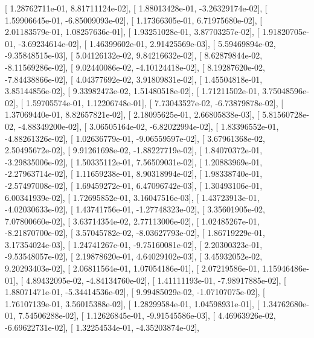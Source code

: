 \documentclass{article}
\begin{document}
       [  1.28762711e-01,   8.81711124e-02],
       [  1.88013428e-01,  -3.26329174e-02],
       [  1.59906645e-01,  -6.85009093e-02],
       [  1.17366305e-01,   6.71975680e-02],
       [  2.01183579e-01,   1.08257636e-01],
       [  1.93251028e-01,   3.87703257e-02],
       [  1.91820705e-01,  -3.69234614e-02],
       [  1.46399602e-01,   2.91425569e-03],
       [  5.59469894e-02,  -9.35848515e-03],
       [  5.04126132e-02,   9.84216632e-02],
       [  8.62879844e-02,  -8.11569286e-02],
       [  9.02440086e-02,  -4.10124418e-02],
       [  8.19287620e-02,  -7.84438866e-02],
       [  4.04377692e-02,   3.91809831e-02],
       [  1.45504818e-01,   3.85144856e-02],
       [  9.33982473e-02,   1.51480518e-02],
       [  1.71211502e-01,   3.75048596e-02],
       [  1.59705574e-01,   1.12206748e-01],
       [  7.73043527e-02,  -6.73879878e-02],
       [  1.37069440e-01,   8.82657821e-02],
       [  2.18095625e-01,   2.66805838e-03],
       [  5.81560728e-02,  -4.88349200e-02],
       [  3.06505164e-02,  -6.82022994e-02],
       [  1.83396552e-01,  -4.88261326e-02],
       [  1.02636779e-01,  -9.06559597e-02],
       [  3.67961368e-02,   2.50495672e-02],
       [  9.91261698e-02,  -1.88227719e-02],
       [  1.84070372e-01,  -3.29835006e-02],
       [  1.50335112e-01,   7.56509031e-02],
       [  1.20883969e-01,  -2.27963714e-02],
       [  1.11659238e-01,   8.90318994e-02],
       [  1.98338740e-01,  -2.57497008e-02],
       [  1.69459272e-01,   6.47096742e-03],
       [  1.30493106e-01,   6.00341939e-02],
       [  1.72695852e-01,   3.16047516e-03],
       [  1.43723913e-01,  -4.02030633e-02],
       [  1.43741756e-01,  -1.27748323e-02],
       [  3.35601905e-02,   7.07800660e-02],
       [  3.63714354e-02,   2.77113006e-02],
       [  1.02485267e-01,  -8.21870700e-02],
       [  3.57045782e-02,  -8.03627793e-02],
       [  1.86719229e-01,   3.17354024e-03],
       [  1.24741267e-01,  -9.75160081e-02],
       [  2.20300323e-01,  -9.53548057e-02],
       [  2.19878620e-01,   4.64029102e-03],
       [  3.45932052e-02,   9.20293403e-02],
       [  2.06811564e-01,   1.07054186e-01],
       [  2.07219586e-01,   1.15946486e-01],
       [  4.89432095e-02,  -4.84134760e-02],
       [  1.41111193e-01,  -7.98917885e-02],
       [  1.88071471e-01,  -5.34414536e-02],
       [  9.99485029e-02,  -1.07107075e-02],
       [  1.76107139e-01,   3.56015388e-02],
       [  1.28299584e-01,   1.04598931e-01],
       [  1.34762680e-01,   7.54506288e-02],
       [  1.12626845e-01,  -9.91545586e-03],
       [  4.46963926e-02,  -6.69622731e-02],
       [  1.32254534e-01,  -4.35203874e-02],
\end{document}
